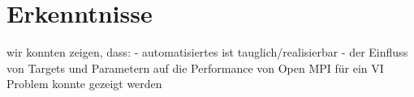 \section{Erkenntnisse}
wir konnten zeigen, dass:
- automatisiertes ist tauglich/realisierbar
- der Einfluss von Targets und Parametern auf die Performance von Open MPI für ein VI Problem konnte gezeigt werden
